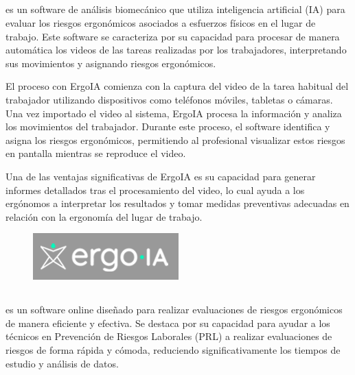 \subsection*{} %
\label{sec:ergoia}
 \cite{ergoia} es un software de análisis biomecánico que utiliza inteligencia artificial (IA) para evaluar los riesgos ergonómicos asociados a esfuerzos físicos en el lugar de trabajo. Este software se caracteriza por su capacidad para procesar de manera automática los videos de las tareas realizadas por los trabajadores, interpretando sus movimientos y asignando riesgos ergonómicos.

El proceso con ErgoIA comienza con la captura del video de la tarea habitual del trabajador utilizando dispositivos como teléfonos móviles, tabletas o cámaras. Una vez importado el video al sistema, ErgoIA procesa la información y analiza los movimientos del trabajador. Durante este proceso, el software identifica y asigna los riesgos ergonómicos, permitiendo al profesional visualizar estos riesgos en pantalla mientras se reproduce el video.

Una de las ventajas significativas de ErgoIA es su capacidad para generar informes detallados tras el procesamiento del video, lo cual ayuda a los ergónomos a interpretar los resultados y tomar medidas preventivas adecuadas en relación con la ergonomía del lugar de trabajo.

\begin{figure}[ht]
\centering
\includegraphics[scale=.8]{content/img/LogoErgoIA.png}
\label{fig:logoErgoIA}
\end{figure}

\subsection*{} %
\label{sec:ergosoftpro}
 \cite{ergosoftpro} es un software online diseñado para realizar evaluaciones de riesgos ergonómicos de manera eficiente y efectiva. Se destaca por su capacidad para ayudar a los técnicos en Prevención de Riesgos Laborales (PRL) a realizar evaluaciones de riesgos de forma rápida y cómoda, reduciendo significativamente los tiempos de estudio y análisis de datos.

